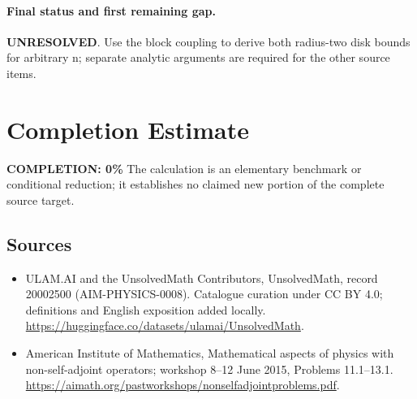 \documentclass[11pt]{article}
\begin{document}
\paragraph{Final status and first remaining gap.}
\textbf{UNRESOLVED}. Use the block coupling to derive both radius-two disk bounds for arbitrary n; separate analytic arguments are required for the other source items.

\section{Completion Estimate}
\noindent\textbf{COMPLETION: 0\%}
The calculation is an elementary benchmark or conditional reduction; it establishes no claimed new portion of the complete source target.

\subsection{Sources}
\begin{itemize}
\item[\hypertarget{source:20002500:1}{S1}] ULAM.AI and the UnsolvedMath Contributors, UnsolvedMath, record 20002500 (AIM-PHYSICS-0008). Catalogue curation under CC BY 4.0; definitions and English exposition added locally.
\url{https://huggingface.co/datasets/ulamai/UnsolvedMath}.
\item[\hypertarget{source:20002500:2}{S2}] American Institute of Mathematics, Mathematical aspects of physics with non-self-adjoint operators; workshop 8–12 June 2015, Problems 11.1–13.1.
\url{https://aimath.org/pastworkshops/nonselfadjointproblems.pdf}.
\end{itemize}
\label{end:20002500}
\end{document}
